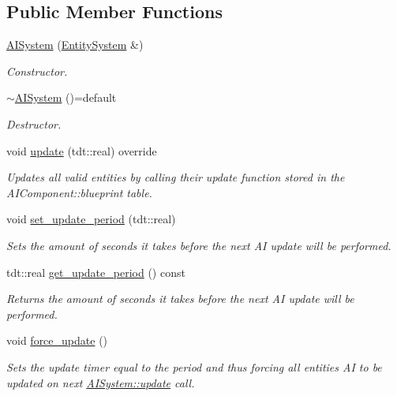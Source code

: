 \subsection*{Public Member Functions}
\begin{DoxyCompactItemize}
\item 
\hyperlink{class_a_i_system_a2b65c67d43bc5b2799ce2f4063e14cbc}{A\+I\+System} (\hyperlink{class_entity_system}{Entity\+System} \&)
\begin{DoxyCompactList}\small\item\em Constructor. \end{DoxyCompactList}\item 
\hyperlink{class_a_i_system_ad59d6780685228efb8fc5af54068897a}{$\sim$\+A\+I\+System} ()=default
\begin{DoxyCompactList}\small\item\em Destructor. \end{DoxyCompactList}\item 
void \hyperlink{class_a_i_system_a2c979ff5f110c79326f17f95c4b655d9}{update} (tdt\+::real) override
\begin{DoxyCompactList}\small\item\em Updates all valid entities by calling their update function stored in the A\+I\+Component\+::blueprint table. \end{DoxyCompactList}\item 
void \hyperlink{class_a_i_system_af5d48f605dc5ae79bed5976189e34510}{set\+\_\+update\+\_\+period} (tdt\+::real)
\begin{DoxyCompactList}\small\item\em Sets the amount of seconds it takes before the next AI update will be performed. \end{DoxyCompactList}\item 
tdt\+::real \hyperlink{class_a_i_system_a93a51bce77035a303024b5bfbefb040a}{get\+\_\+update\+\_\+period} () const 
\begin{DoxyCompactList}\small\item\em Returns the amount of seconds it takes before the next AI update will be performed. \end{DoxyCompactList}\item 
void \hyperlink{class_a_i_system_a6d1f35cb2ceddfcfa6cfc24531915160}{force\+\_\+update} ()
\begin{DoxyCompactList}\small\item\em Sets the update timer equal to the period and thus forcing all entities\textquotesingle{} AI to be updated on next \hyperlink{class_a_i_system_a2c979ff5f110c79326f17f95c4b655d9}{A\+I\+System\+::update} call. \end{DoxyCompactList}\end{DoxyCompactItemize}
